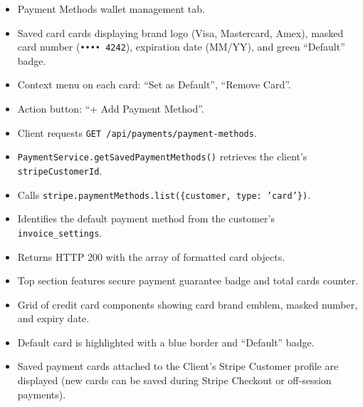 \begin{itemize}[leftmargin=1.6em,topsep=3pt,itemsep=2pt,parsep=0pt,label=$\bullet$]
      \item Payment Methods wallet management tab.
      \item Saved card cards displaying brand logo (Visa, Mastercard, Amex), masked card number (\texttt{•••• 4242}), expiration date (MM/YY), and green ``Default'' badge.
      \item Context menu on each card: ``Set as Default'', ``Remove Card''.
      \item Action button: ``+ Add Payment Method''.
\end{itemize}

\begin{itemize}[leftmargin=1.6em,topsep=3pt,itemsep=2pt,parsep=0pt,label=$\bullet$]
      \item Client requests \texttt{GET /api/payments/payment-methods}.
      \item \texttt{PaymentService.getSavedPaymentMethods()} retrieves the client's \texttt{stripeCustomerId}.
      \item Calls \texttt{stripe.paymentMethods.list(\{customer, type: 'card'\})}.
      \item Identifies the default payment method from the customer's \texttt{invoice\_settings}.
      \item Returns HTTP 200 with the array of formatted card objects.
\end{itemize}

\begin{itemize}[leftmargin=1.6em,topsep=3pt,itemsep=2pt,parsep=0pt,label=$\bullet$]
      \item Top section features secure payment guarantee badge and total cards counter.
      \item Grid of credit card components showing card brand emblem, masked number, and expiry date.
      \item Default card is highlighted with a blue border and ``Default'' badge.
      \item Saved payment cards attached to the Client's Stripe Customer profile are displayed (new cards can be saved during Stripe Checkout or off-session payments).
\end{itemize}

